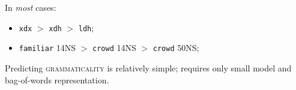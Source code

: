 \documentclass[xcolor={dvipsnames}]{beamer}
\newcommand{\feat}[1]{\textsc{#1}}
\newcommand{\param}[1]{\texttt{#1}}
\begin{document}
\begin{frame}
\begin{table}[htb!]
\begin{center}
\end{center}
\end{table}


\pause
In \textit{most} cases:
\begin{itemize}
\pause
\item \param{xdx} $>$ \param{xdh} $>$ \param{ldh};
\pause
\item \param{familiar} 14NS $>$ \param{crowd} 14NS $>$ \param{crowd} 50NS;
\end{itemize}

\vspace{1em}

\pause
Predicting \feat{grammaticality} is relatively simple; requires only small model and bag-of-words representation. \\

\end{frame}

\end{document}
